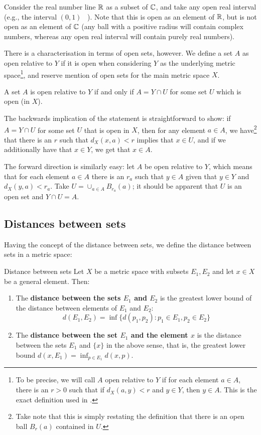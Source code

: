 Consider the real number line $\mathbb{R}$ as a subset of $\mathbb{C}$, and take any open real interval (e.g., the interval $(0,1)$ \ ). Note that this is open as an element of $\mathbb{R}$, but is not open as an element of $\mathbb{C}$ (any ball with a positive radius will contain complex numbers, whereas any open real interval will contain purely real numbers).

There is a characterisation in terms of open sets, however. We define a set $A$ as open relative to $Y$ if it is open when considering $Y$ as the underlying metric space\footnote{To be precise, we will call $A$ open relative to $Y$ if for each element $a\in A$, there is an $r>0$ such that if $d_{X}(a,y)< r$ and $y \in Y$, then $y\in A$. This is the exact definition used in \cite{rudin}.}, and reserve mention of open sets for the main metric space $X$.

\begin{bprop}{}{}
A set $A$ is open relative to $Y$ if and only if $A = Y \cap U$ for some set $U$ which is open (in $X$).
\end{bprop}
\begin{bproof}{}{}
The backwards implication of the statement is straightforward to show: if $A = Y \cap U$ for some set $U$ that is open in $X$, then for any element $a\in A$, we have\footnote{Take note that this is simply restating the definition that there is an open ball $B_{r}(a)$ contained in $U$.} that there is an $r$ such that $d_{X}(x,a) < r$ implies that $x\in U$, and if we additionally have that $x\in Y$, we get that $x\in A$.

The forward direction is similarly easy: let $A$ be open relative to $Y$, which means that for each element $a\in A$ there is an $r_{a}$ such that $y\in A$ given that $y\in Y$ and $d_{X}(y,a) < r_{a}$. Take $U = \cup_{a\in A} B_{r_{a}}(a)$; it should be apparent that $U$ is an open set and $Y \cap U = A$.
\eop
\end{bproof}

\subsection{Distances between sets}

Having the concept of the distance between sets, we define the distance between sets in a metric space:
\begin{bdefin}{Distance between sets}{}
Let $X$ be a metric space with subsets $E_{1},E_{2}$ and let $x\in X$ be a general element. Then:
\begin{enumerate}
    \item The \textbf{distance between the sets $E_{1}$ and $E_{2}$} is the greatest lower bound of the distance between elements of $E_{1}$ and $E_{2}$: \[ d(E_{1}, E_{2}) = \inf \{ d(p_{1}, p_{2}) : p_{1} \in E_{1}, p_{2}\in E_{2} \} \]
    \item The \textbf{distance between the set $E_{1}$ and the element $x$} is the distance between the sets $E_{1}$ and $\{ x\}$ in the above sense, that is, the greatest lower bound \mbox{$ d(x, E_{1}) =\inf_{p\in E_{1}} d(x,p)$}.
\end{enumerate}
\end{bdefin}

